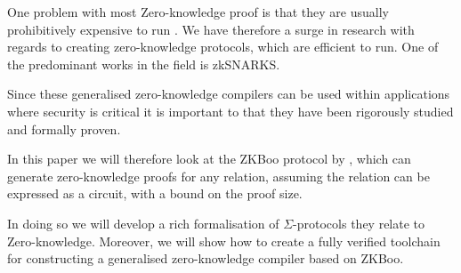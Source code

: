 One problem with most Zero-knowledge proof is that they are usually
prohibitively expensive to run . We have therefore a surge in
research with regards to creating zero-knowledge protocols, which are efficient
to run. One of the predominant works in the field is zkSNARKS.

Since these generalised zero-knowledge compilers can be used within applications
where security is critical it is important to that they have been rigorously
studied and formally proven.

In this paper we will therefore look at the ZKBoo protocol by \citet{zkboo},
which can generate zero-knowledge proofs for any relation, assuming the relation
can be expressed as a circuit, with a bound on the proof size.

In doing so we will develop a rich formalisation of $\Sigma$-protocols they
relate to Zero-knowledge. Moreover, we will show how to create a fully verified
toolchain for constructing a generalised zero-knowledge compiler based on ZKBoo.


